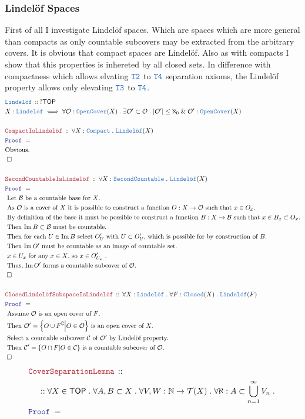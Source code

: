 \documentclass[12pt]{scrartcl}
\newcommand{\TYPE}[1]{\textcolor{NavyBlue}{\mathtt{#1}}}
\newcommand{\LOGIC}[1]{\textcolor{Blue}{\mathtt{#1}}}
\newcommand{\THM}[1]{\textcolor{Maroon}{\mathtt{#1}}}
\renewcommand{\.}{\; . \;}
\newcommand{\Theorem}[2]{& \THM{#1} \, :: \, #2 \\ & \Proof = \\ }
\newcommand{\DeclareType}[2]{& \TYPE{#1} \, :: \, #2 \\}
\newcommand{\DefineType}[3]{& #1 : \TYPE{#2} \iff #3 \\}
\newcommand{\NewLine}{\\ & \kern 1pc}
\newcommand{\Page}[1]{ \begin{align*} #1 \end{align*}   }
\newcommand{\Explain}[1]{& \text{#1.} \\}
\renewcommand{\And}{\; \& \;}
\newcommand{\Nat}{\mathbb{N} }
\DeclareMathOperator*{\im}{Im}
\renewcommand{\c}{\complement}
\newcommand{\QED}{\; \square}
\newcommand{\EndProof}{& \QED \\}
\newcommand{\Proof}{\LOGIC{Proof} \; }
\renewcommand{\C}{\mathcal{C}}
\newcommand{\B}{\mathcal{B}}
\newcommand{\Closed}{\TYPE{Closed}}
\newcommand{\Compact}{\TYPE{Compact}}
\newcommand{\Lindelof}{\TYPE{Lindel\ddot{o}f}}
\newcommand{\TOP}{\mathsf{TOP}}
\newcommand{\T}{\mathcal{T}}
\renewcommand{\O}{\mathcal{O}}
\begin{document}
\subsubsection{Lindel\"of Spaces}
First of all I investigate Lindel\"of spaces. 
Which are spaces which are more general than compacts as only countable
subcovers may be extracted from the arbitrary covers. It is obvious that compact spaces are Lindel\"of.
Also as with compacts I show that this properties is inhereted by all closed sets. In difference with compactness which allows elvating $\TYPE{T2}$ to $\TYPE{T4}$ separation axioms, the Lindel\"of property allows only elevating $\TYPE{T3}$ to $\TYPE{T4}$.
\Page{   
	\DeclareType{Lindel\ddot{o}f}
	{
		?\TOP
	}
	\DefineType{X}{Lindel\ddot{o}f}
	{
		\forall \mathcal{O} : \TYPE{OpenCover}(X) \. 
		\exists \mathcal{O}' \subset \mathcal{O} \.
		|\mathcal{O}'| \le \aleph_0 \And \mathcal{O}' : \TYPE{OpenCover}(X)
	}
	\\
	\Theorem{CompactIsLindel\ddot{o}f}
	{
		\forall X : \Compact \. \Lindelof(X)
	}
	\Explain{Obvious}
	\EndProof
	\\
	\Theorem{SecondCountableIsLindel\ddot{o}f}
	{
		\forall X : \TYPE{SecondCountable} \.
		\Lindelof(X)
	}
	\Explain{ 
		Let $\B$ be a countable base for $X$}
	\Explain{
		As $\O$ is a cover of $X$ it is possible to construct a function
		$O : X \to \O$ such that $x \in O_x$}
	\Explain{
		By definition of the base it must be possible to construct a function
	    $B : X \to \B$ such that $x \in B_x \subset O_x$}
	\Explain{
		Then $\im B \subset \B$ must be countable}
	\Explain{
		Then  for each $U \in \im B$ select $O'_U$ with $U \subset O'_U$,
		which is possible for by construction of $B$}
	\Explain{
		Then $\im O'$ must be countable as an image of countable set}
	\Explain{
		$x \in U_x$ for any $x \in X$, so 
		$x \in O'_{U_x}$
	}
	\Explain{
		Thus, $\im O'$ forms a countable subcover of $\O$}
	\EndProof
	\\
	\Theorem{
		ClosedLindel\ddot{o}fSubspaceIsLindel\ddot{o}f
	}
	{
		\forall X : \Lindelof \.
		\forall F : \Closed(X) \.
		\Lindelof(F)
	}
	\Explain{
		Assume $\O$ is an open cover of $F$}
	\Explain{
		Then $\O'= \Big\{O\cup F^\c \Big|O \in \O \Big\}$ is an open cover of $X$}
	\Explain{
		Select a countable subcover $\C$ of $\O'$ by Lindel\"of property}
	\Explain{
		Then $\C' = \{ O \cap F  | O \in \C \}$ is a countable subcover of $\O$}
	\EndProof
}\Page{
	\Theorem{CoverSeparationLemma}
	{
		\NewLine ::		
		\forall X \in \TOP \.
		\forall A,B  \subset X \.
		\forall V,W : \Nat \to \T(X) \.
		\forall \aleph :  A \subset \bigcup^\infty_{n=1} V_n \.
}}
\end{document}
